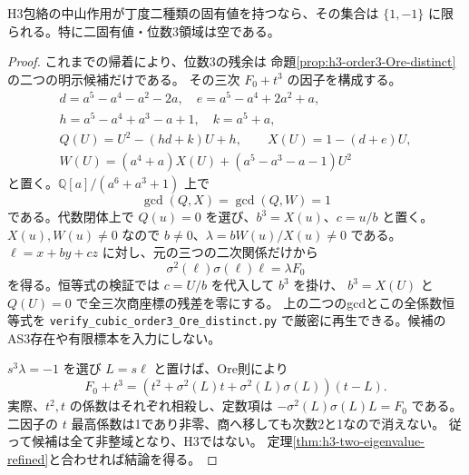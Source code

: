 \begin{theorem}
\label{thm:h3-order3-two-eigenvalues-excluded}
H3包絡の中山作用が丁度二種類の固有値を持つなら、その集合は
$\{1,-1\}$ に限られる。特に二固有値・位数3領域は空である。
\end{theorem}
\begin{proof}
これまでの帰着により、位数3の残余は
命題\ref{prop:h3-order3-Ore-distinct}の二つの明示候補だけである。
その三次 $F_0+t^3$ の因子を構成する。
\[
\begin{gathered}
 d=a^5-a^4-a^2-2a,\quad e=a^5-a^4+2a^2+a,\\
 h=a^5-a^4+a^3-a+1,\quad k=a^5+a,\\
 Q(U)=U^2-(hd+k)U+h,\qquad X(U)=1-(d+e)U,\\
 W(U)=(a^4+a)X(U)+(a^5-a^3-a-1)U^2
\end{gathered}
\]
と置く。$\mathbb Q[a]/(a^6+a^3+1)$ 上で
\[
 \gcd(Q,X)=\gcd(Q,W)=1
\]
である。代数閉体上で $Q(u)=0$ を選び、$b^3=X(u)$、$c=u/b$ と置く。
$X(u),W(u)\ne0$ なので $b\ne0$、$\lambda=bW(u)/X(u)\ne0$ である。
$\ell=x+by+cz$ に対し、元の三つの二次関係だけから
\[
 \sigma^2(\ell)\sigma(\ell)\ell=\lambda F_0
\]
を得る。恒等式の検証では $c=U/b$ を代入して $b^3$ を掛け、
$b^3=X(U)$ と $Q(U)=0$ で全三次商座標の残差を零にする。
上の二つのgcdとこの全係数恒等式を
\texttt{verify\_\allowbreak{}cubic\_\allowbreak{}order3\_\allowbreak{}Ore\_\allowbreak{}distinct.py}
で厳密に再生できる。候補のAS3存在や有限標本を入力にしない。

$s^3\lambda=-1$ を選び $L=s\ell$ と置けば、Ore則により
\[
 F_0+t^3=
 (t^2+\sigma^2(L)t+\sigma^2(L)\sigma(L))(t-L).
\]
実際、$t^2,t$ の係数はそれぞれ相殺し、定数項は
$-\sigma^2(L)\sigma(L)L=F_0$ である。
二因子の $t$ 最高係数は1であり非零、商へ移しても次数2と1なので消えない。
従って候補は全て非整域となり、H3ではない。
定理\ref{thm:h3-two-eigenvalue-refined}と合わせれば結論を得る。
\end{proof}

